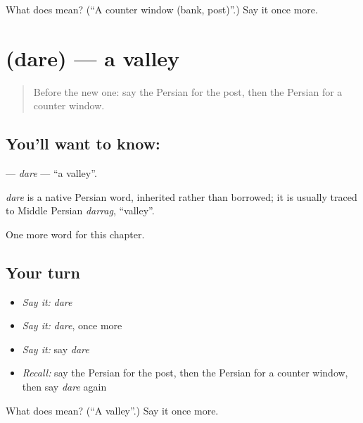 \begin{tcolorbox}[breakable,colback=teal!4,colframe=teal!35!black,title={Before you move on}]
What does  mean? (\textquotedblleft{}A counter window (bank, post)\textquotedblright{}.) Say it once more.
\end{tcolorbox}
\section[\texorpdfstring{\fa{دره} (dare)}{دره (dare)}]{ (dare) — a valley}

\label{lesson:FA-C194-dare}



\begin{quote}
Before the new one: say the Persian for the post, then the Persian for a counter window.
\end{quote}

\subsection*{You'll want to know: }
\textbf{} — \emph{dare} — \textquotedblleft{}a valley\textquotedblright{}.

\begin{cousinweb}
\emph{dare} is a native Persian word, inherited rather than borrowed; it is usually traced to Middle Persian \emph{darrag}, \textquotedblleft{}valley\textquotedblright{}.
\end{cousinweb}

\begin{grammarlens}[title={What you've built}]
One more word for this chapter.
\end{grammarlens}

\subsection*{Your turn}
\begin{itemize}
\raggedright
  \item \emph{Say it:} \emph{dare}
  \item \emph{Say it:} \emph{dare}, once more
  \item \emph{Say it:} say \emph{dare}
  \item \emph{Recall:} say the Persian for the post, then the Persian for a counter window, then say \emph{dare} again
\end{itemize}

\begin{tcolorbox}[breakable,colback=teal!4,colframe=teal!35!black,title={Before you move on}]
What does  mean? (\textquotedblleft{}A valley\textquotedblright{}.) Say it once more.
\end{tcolorbox}
